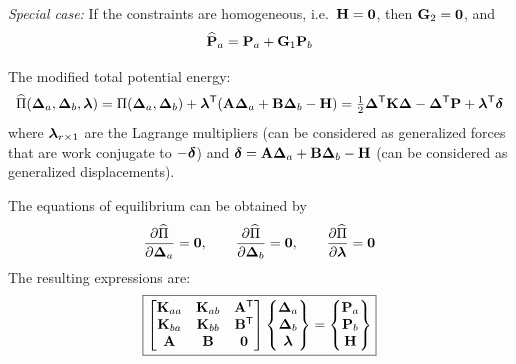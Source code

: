 \emph{Special case:} If the constraints are homogeneous, i.e.\ $\mathbf{H} = \mathbf{0}$, then $\mathbf{G}_2 = \mathbf{0}$, and
\begin{equation*}
  \widehat{\mathbf{P}}_a = \mathbf{P}_a + \mathbf{G}_1\mathbf{P}_b
\end{equation*}

The modified total potential energy:
\begin{equation}
  \widehat\Pi(\bm{\Delta}_a, \bm{\Delta}_b, \bm{\lambda}) = \Pi(\bm{\Delta}_a, \bm{\Delta}_b) + \bm{\lambda}^{\mathsf{T}}(\mathbf{A}\bm{\Delta}_a + \mathbf{B}\bm{\Delta}_b - \mathbf{H})
  = \tfrac12\bm{\Delta}^{\mathsf{T}}\mathbf{K}\bm{\Delta} - \bm{\Delta}^{\mathsf{T}}\mathbf{P} + \bm{\lambda}^{\mathsf{T}}\bm{\delta}
\end{equation}
where $\bm{\lambda}_{r\times1}$ are the Lagrange multipliers (can be considered as generalized forces that are work conjugate to $-\bm{\delta}$) and $\bm{\delta} = \mathbf{A}\bm{\Delta}_a + \mathbf{B}\bm{\Delta}_b - \mathbf{H}$ (can be considered as generalized displacements).

The equations of equilibrium can be obtained by
\begin{equation*}
  \frac{\partial \widehat\Pi}{\partial \bm{\Delta}_a} = \mathbf{0},\qquad \frac{\partial \widehat\Pi}{\partial \bm{\Delta}_b} = \mathbf{0},\qquad \frac{\partial \widehat\Pi}{\partial \bm{\lambda}} = \mathbf{0}
\end{equation*}
The resulting expressions are:
\begin{equation}
  \boxed{\begin{bmatrix}\mathbf{K}_{aa} & \mathbf{K}_{ab} & \mathbf{A}^{\mathsf{T}}\\ \mathbf{K}_{ba} & \mathbf{K}_{bb} & \mathbf{B}^{\mathsf{T}}\\ \mathbf{A} & \mathbf{B} & \mathbf{0}\end{bmatrix}\begin{Bmatrix}\bm{\Delta}_a\\ \bm{\Delta}_b\\ \bm{\lambda}\end{Bmatrix} = \begin{Bmatrix}\mathbf{P}_a\\ \mathbf{P}_b\\ \mathbf{H}\end{Bmatrix}}
\end{equation}

